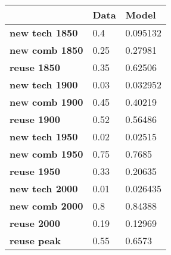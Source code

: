 \begin{tabular}{|l|l|l|}
\hline
&\textbf{Data}&\textbf{Model}\\\hline
\textbf{new tech 1850}&0.4&0.095132\\\hline
\textbf{new comb 1850}&0.25&0.27981\\\hline
\textbf{reuse 1850}&0.35&0.62506\\\hline
\textbf{new tech 1900}&0.03&0.032952\\\hline
\textbf{new comb 1900}&0.45&0.40219\\\hline
\textbf{reuse 1900}&0.52&0.56486\\\hline
\textbf{new tech 1950}&0.02&0.02515\\\hline
\textbf{new comb 1950}&0.75&0.7685\\\hline
\textbf{reuse 1950}&0.33&0.20635\\\hline
\textbf{new tech 2000}&0.01&0.026435\\\hline
\textbf{new comb 2000}&0.8&0.84388\\\hline
\textbf{reuse 2000}&0.19&0.12969\\\hline
\textbf{reuse peak}&0.55&0.6573\\\hline
\end{tabular}
